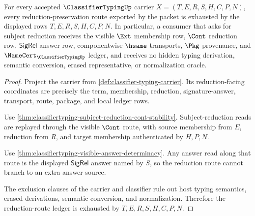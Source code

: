 \begin{theorem}
\label{thm:classifiertyping-reduction-route-ledger-exhaustion}
For every accepted $\ClassifierTypingUp$ carrier $X=(T,E,R,S,H,C,P,N)$, every reduction-preservation route exported by the packet is exhausted by the displayed rows $T,E,R,S,H,C,P,N$. In particular, a consumer that asks for subject reduction receives the visible $\Ext$ membership row, $\Cont$ reduction row, $\mathsf{SigRel}$ answer row, componentwise $\hsame$ transports, $\Pkg$ provenance, and $\NameCert_{\ClassifierTypingUp}$ ledger, and receives no hidden typing derivation, semantic conversion, erased representative, or normalization oracle.
\end{theorem}
\begin{proof}
Project the carrier from \autoref{def:classifier-typing-carrier}. Its reduction-facing coordinates are precisely the term, membership, reduction, signature-answer, transport, route, package, and local ledger rows.

Use \autoref{thm:classifiertyping-subject-reduction-cont-stability}. Subject-reduction reads are replayed through the visible $\Cont$ route, with source membership from $E$, reduction from $R$, and target membership authenticated by $H,P,N$.

Use \autoref{thm:classifiertyping-visible-answer-determinacy}. Any answer read along that route is the displayed $\mathsf{SigRel}$ answer named by $S$, so the reduction route cannot branch to an extra answer source.

The exclusion clauses of the carrier and classifier rule out host typing semantics, erased derivations, semantic conversion, and normalization. Therefore the reduction-route ledger is exhausted by $T,E,R,S,H,C,P,N$.
\end{proof}

